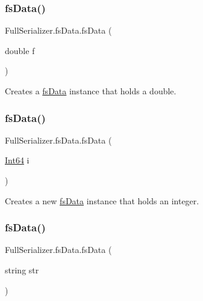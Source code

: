 \subsubsection{\texorpdfstring{fs\+Data()}{fsData()}\hspace{0.1cm}{\footnotesize\ttfamily [3/7]}}
{\footnotesize\ttfamily Full\+Serializer.\+fs\+Data.\+fs\+Data (\begin{DoxyParamCaption}\item[{double}]{f }\end{DoxyParamCaption})\hspace{0.3cm}{\ttfamily [inline]}}



Creates a \hyperlink{class_full_serializer_1_1fs_data}{fs\+Data} instance that holds a double. 

\mbox{\label{class_full_serializer_1_1fs_data_ab942e5e4fb36b7e815ce0f4195cc84da}} 
\subsubsection{\texorpdfstring{fs\+Data()}{fsData()}\hspace{0.1cm}{\footnotesize\ttfamily [4/7]}}
{\footnotesize\ttfamily Full\+Serializer.\+fs\+Data.\+fs\+Data (\begin{DoxyParamCaption}\item[{\hyperlink{namespace_full_serializer_a6eee33d63b94e40fdfcfc59af9fcfc82afbde23b11d7e59af7828e81144c8b487}{Int64}}]{i }\end{DoxyParamCaption})\hspace{0.3cm}{\ttfamily [inline]}}



Creates a new \hyperlink{class_full_serializer_1_1fs_data}{fs\+Data} instance that holds an integer. 

\mbox{\label{class_full_serializer_1_1fs_data_a18d00eb27ffcbbd57ab7372856ae30f7}} 
\subsubsection{\texorpdfstring{fs\+Data()}{fsData()}\hspace{0.1cm}{\footnotesize\ttfamily [5/7]}}
{\footnotesize\ttfamily Full\+Serializer.\+fs\+Data.\+fs\+Data (\begin{DoxyParamCaption}\item[{string}]{str }\end{DoxyParamCaption})\hspace{0.3cm}{\ttfamily [inline]}}



